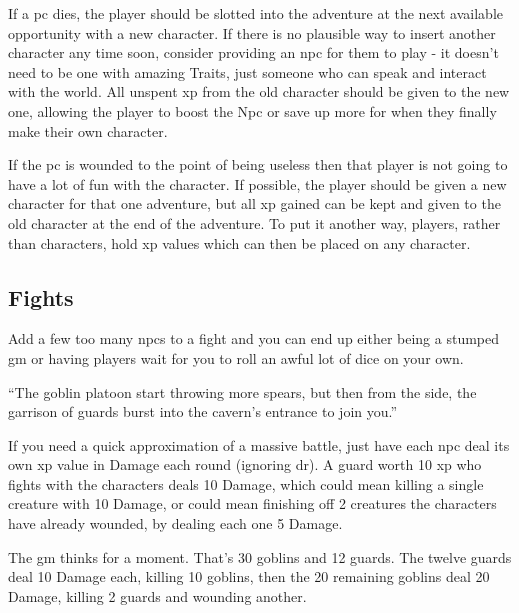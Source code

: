 \begin{multicols}{2}
If a \gls{pc} dies, the player should be slotted into the adventure at the next available opportunity with a new character.
If there is no plausible way to insert another character any time soon, consider providing an \gls{npc} for them to play - it doesn't need to be one with amazing Traits, just someone who can speak and interact with the world.
All unspent \gls{xp} from the old character should be given to the new one, allowing the player to boost the N\gls{pc} or save up more for when they finally make their own character.

If the \gls{pc} is wounded to the point of being useless then that player is not going to have a lot of fun with the character.
If possible, the player should be given a new character for that one adventure, but all \gls{xp} gained can be kept and given to the old character at the end of the adventure.
To put it another way, players, rather than characters, hold \gls{xp} values which can then be placed on any character.

\subsection{ Fights}

Add a few too many \glspl{npc} to a fight and you can end up either being a stumped \gls{gm} or having players wait for you to roll an awful lot of dice on your own.

\begin{exampletext}

	``The goblin platoon start throwing more spears, but then from the side, the garrison of guards burst into the cavern's entrance to join you.''

\end{exampletext}

If you need a quick approximation of a massive battle, just have each \gls{npc} deal its own \gls{xp} value in Damage each round (ignoring \gls{dr}).
A guard worth 10 \gls{xp} who fights with the characters deals 10 Damage, which could mean killing a single creature with 10 Damage, or could mean finishing off 2 creatures the characters have already wounded, by dealing each one 5 Damage.

\begin{exampletext}

	The \gls{gm} thinks for a moment.
	That's 30 goblins and 12 guards.
	The twelve guards deal 10 Damage each, killing 10 goblins, then the 20 remaining goblins deal 20 Damage, killing 2 guards and wounding another.


\end{exampletext}
\end{multicols}
